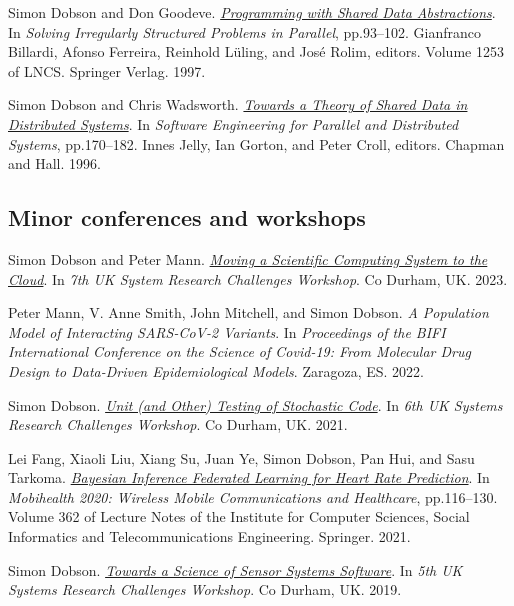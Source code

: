 \documentclass[11pt]{article}
\begin{document}
\label{org1852b20}Simon Dobson and Don Goodeve.  \emph{\href{https://simondobson.org/softcopy/irregular-97.pdf}{Programming with Shared Data Abstractions}}. In \emph{Solving Irregularly Structured Problems in Parallel}, pp.93–102. Gianfranco Billardi, Afonso Ferreira, Reinhold Lüling, and José Rolim, editors. Volume 1253 of LNCS. Springer Verlag. 1997.

\label{org688ca41}Simon Dobson and Chris Wadsworth.  \emph{\href{https://simondobson.org/softcopy/pdse-96.pdf}{Towards a Theory of Shared Data in Distributed Systems}}. In \emph{Software Engineering for Parallel and Distributed Systems}, pp.170–182. Innes Jelly, Ian Gorton, and Peter Croll, editors. Chapman and Hall. 1996.

\subsection{Minor conferences and workshops}
\label{sec:orgd79ad70}

\label{orgd299cac}Simon Dobson and Peter Mann.  \emph{\href{https://simondobson.org/softcopy/uksystems-23.pdf}{Moving a Scientific Computing System to the Cloud}}. In \emph{7th UK System Research Challenges Workshop}. Co Durham, UK. 2023.

\label{org6747201}Peter Mann, V. Anne Smith, John Mitchell, and Simon Dobson.  \emph{A Population Model of Interacting SARS-CoV-2 Variants}. In \emph{Proceedings of the BIFI International Conference on the Science of Covid-19: From Molecular Drug Design to Data-Driven Epidemiological Models}. Zaragoza, ES. 2022.

\label{org4a117dd}Simon Dobson.  \emph{\href{https://simondobson.org/softcopy/stochastic-testing-21.pdf}{Unit (and Other) Testing of Stochastic Code}}. In \emph{6th UK Systems Research Challenges Workshop}. Co Durham, UK. 2021.

\label{orgdd83ab0}Lei Fang, Xiaoli Liu, Xiang Su, Juan Ye, Simon Dobson, Pan Hui, and Sasu Tarkoma.  \emph{\href{https://doi.org/10.1007/978-3-030-70569-5\_8}{Bayesian Inference Federated Learning for Heart Rate Prediction}}. In \emph{Mobihealth 2020: Wireless Mobile Communications and Healthcare}, pp.116–130. Volume 362 of Lecture Notes of the Institute for Computer Sciences, Social Informatics and Telecommunications Engineering. Springer. 2021.

\label{org34bb558}Simon Dobson.  \emph{\href{https://simondobson.org/softcopy/s4-uk-systems-19.pdf}{Towards a Science of Sensor Systems Software}}. In \emph{5th UK Systems Research Challenges Workshop}. Co Durham, UK. 2019.
\end{document}
